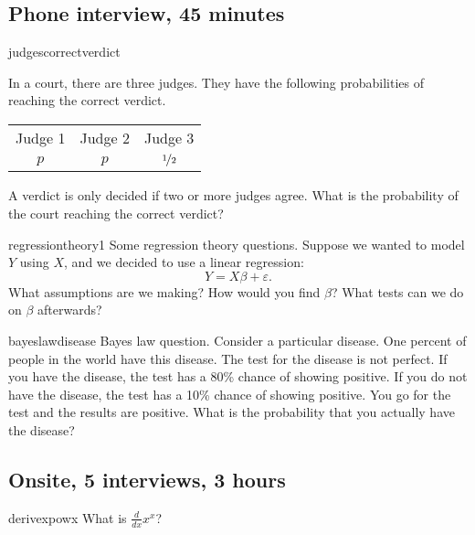 \documentclass[a4paper]{article}
\begin{document}
\clearpage



\clearpage
\subsection{Phone interview, 45 minutes}
\begin{question}{judgescorrectverdict}

In a court, there are three judges.
They have the following probabilities of reaching the correct verdict.

\begin{center}
\begin{tabular}{ccc}
Judge 1 & Judge 2 & Judge 3 \\
$p$ &
$p$ &
$\nicefrac{1}{2}$ \\
\end{tabular}
\end{center}
A verdict is only decided if two or more judges agree.
What is the probability of the court reaching the correct verdict?
\end{question}


\begin{question}{regressiontheory1}
Some regression theory questions.
Suppose we wanted to model $Y$ using $X$, and we decided to use a linear regression:
\[
  Y = X \beta + \varepsilon
  \text{.}
\]
What assumptions are we making?
How would you find $\beta$?
What tests can we do on $\beta$ afterwards?
\end{question}


\begin{question}{bayeslawdisease}
Bayes law question.
Consider a particular disease.
One percent of people in the world have this disease.
The test for the disease is not perfect.
If you have the disease, the test has a 80\% chance of showing positive.
If you do not have the disease, the test has a 10\% chance of showing positive.
You go for the test and the results are positive.
What is the probability that you actually have the disease?
\end{question}

\clearpage




\clearpage
\subsection{Onsite, 5 interviews, 3 hours}
\begin{question}{derivexpowx}
What is $\frac{d}{dx}x^x$?
\end{question}
\end{document}
